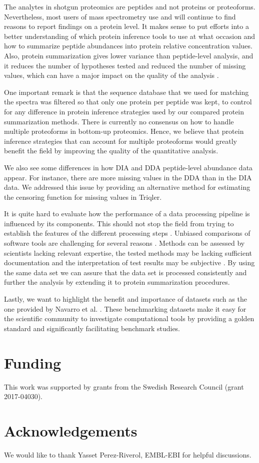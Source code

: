 \documentclass[10pt,letterpaper]{article}
\begin{document}
The analytes in shotgun proteomics are peptides and not proteins or proteoforms. Nevertheless, most users of mass spectrometry use and will continue to find reasons to report findings on a protein level. It makes sense to put efforts into a better understanding of which protein inference tools to use at what occasion and how to summarize peptide abundances into protein relative concentration values. Also, protein summarization gives lower variance than peptide-level analysis, and it reduces the number of hypotheses tested and reduced the number of missing values, which can have a major impact on the quality of the analysis \cite{plubell2021can}.   

One important remark is that the sequence database that we used for matching the spectra was filtered so that only one protein per peptide was kept, to control for any difference in protein inference strategies used by our compared protein summarization methods. There is currently no consensus on how to handle multiple proteoforms in bottom-up proteomics. Hence, we believe that protein inference strategies that can account for multiple proteoforms would greatly benefit the field by improving the quality of the quantitative analysis. 

We also see some differences in how DIA and DDA peptide-level abundance data appear. For instance, there are more missing values in the DDA than in the DIA data. We addressed this issue by providing an alternative method for estimating the censoring function for missing values in Triqler.

It is quite hard to evaluate how the performance of a data processing pipeline is influenced by its components. This should not stop the field from trying to establish the features of the different processing steps \cite{dufresne2014abrf,gatto2016testing,navarro2016multicenter}. Unbiased comparisons of software tools are challenging for several reasons \cite{dufresne2014abrf}. Methods can be assessed by scientists lacking relevant expertise, the tested methods may be lacking sufficient documentation and the interpretation of test results may be subjective \cite{yates2012toward,leprevost2014best,pak2013clustering,faircomparison2015}. By using the same data set we can assure that the data set is processed consistently and further the analysis by extending it to protein summarization procedures.

Lastly, we want to highlight the benefit and importance of datasets such as the one provided by Navarro et al. \cite{navarro2016multicenter}. These benchmarking datasets make it easy for the scientific community to investigate computational tools by providing a golden standard and significantly facilitating benchmark studies. 

\section*{Funding}

This work was supported by grants from the Swedish Research Council (grant 2017-04030).

\section*{Acknowledgements}

We would like to thank Yasset Perez-Riverol, EMBL-EBI for helpful discussions.



%

\end{document}
